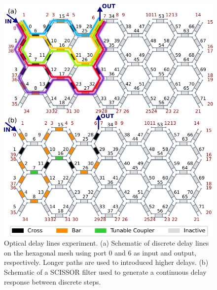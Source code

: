 \begin{figure}[t!]
	\begin{center}
		\includegraphics{figures/ch3-delay_circuits.pdf}
	\end{center}
	\caption{Optical delay lines experiment.
		(a) Schematic of discrete delay lines on the hexagonal mesh using port 0 and 6 as input and output, respectively.
		Longer paths are used to introduced higher delays.
		(b) Schematic of a SCISSOR filter used to generate a continuous delay response between discrete steps.
	}\label{fig:ch3-delay_circuits}
\end{figure}

